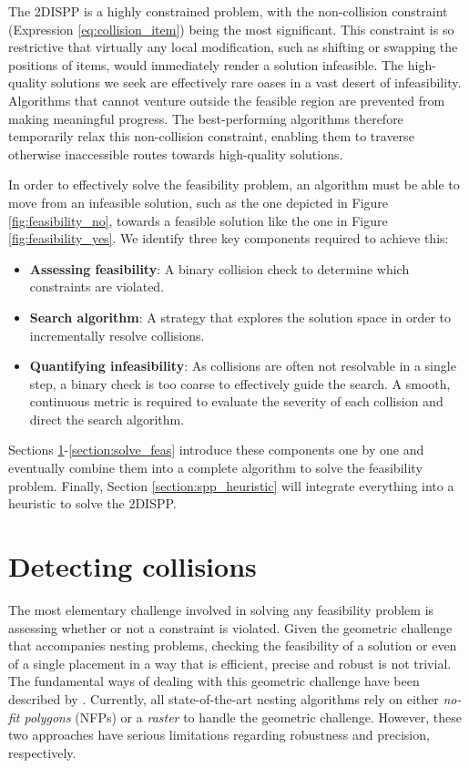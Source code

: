 \documentclass[preprint, 11pt, authoryear]{elsarticle}
\begin{document}
The 2DISPP is a highly constrained problem, with the non-collision constraint (Expression \ref{eq:collision_item}) being the most significant.
This constraint is so restrictive that virtually any local modification, such as shifting or swapping the positions of items, would immediately render a solution infeasible.
The high-quality solutions we seek are effectively rare oases in a vast desert of infeasibility.
Algorithms that cannot venture outside the feasible region are prevented from making meaningful progress.
The best-performing algorithms therefore temporarily relax this non-collision constraint, enabling them to traverse otherwise inaccessible routes towards high-quality solutions.


In order to effectively solve the feasibility problem, an algorithm must be able to move from an infeasible solution, such as the one depicted in Figure \ref{fig:feasibility_no}, towards a feasible solution like the one in Figure \ref{fig:feasibility_yes}.
We identify three key components required to achieve this:

\begin{itemize}
    \item \textbf{Assessing feasibility}: 
    A binary collision check to determine which constraints are violated.
    \item \textbf{Search algorithm}: 
    A strategy that explores the solution space in order to incrementally resolve collisions.
    \item \textbf{Quantifying infeasibility}: 
    As collisions are often not resolvable in a single step, a binary check is too coarse to effectively guide the search. A smooth, continuous metric is required to evaluate the severity of each collision and direct the search algorithm.
\end{itemize}

Sections \ref{section:detecting_collisions}-\ref{section:solve_feas} introduce these components one by one and eventually combine them into a complete algorithm to solve the feasibility problem.
Finally, Section \ref{section:spp_heuristic} will integrate everything into a heuristic to solve the 2DISPP.

\section{Detecting collisions} \label{section:detecting_collisions}
The most elementary challenge involved in solving any feasibility problem is assessing whether or not a constraint is violated.
Given the geometric challenge that accompanies nesting problems, checking the feasibility of a solution or even of a single placement in a way that is efficient, precise and robust is not trivial.
The fundamental ways of dealing with this geometric challenge have been described by \citet{bennell2008geometry}.
Currently, all state-of-the-art nesting algorithms rely on either \emph{no-fit polygons} (NFPs) or a \emph{raster} to handle the geometric challenge.
However, these two approaches have serious limitations regarding robustness and precision, respectively.
\end{document}
